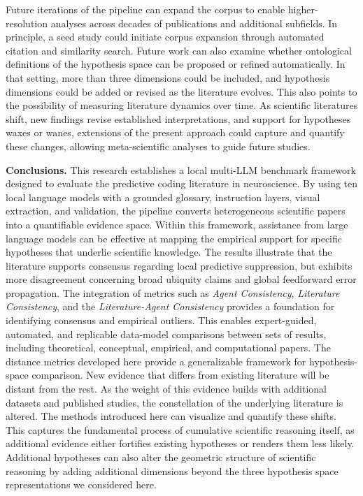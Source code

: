 \documentclass[12pt]{article}
\begin{document}
Future iterations of the pipeline can expand the corpus to enable higher-resolution analyses across decades of publications and additional subfields. In principle, a seed study could initiate corpus expansion through automated citation and similarity search. Future work can also examine whether ontological definitions of the hypothesis space can be proposed or refined automatically. In that setting, more than three dimensions could be included, and hypothesis dimensions could be added or revised as the literature evolves. This also points to the possibility of measuring literature dynamics over time. As scientific literatures shift, new findings revise established interpretations, and support for hypotheses waxes or wanes, extensions of the present approach could capture and quantify these changes, allowing meta-scientific analyses to guide future studies.


\noindent\textbf{Conclusions.} This research establishes a local multi-LLM benchmark framework designed to evaluate the predictive coding literature in neuroscience. By using ten local language models with a grounded glossary, instruction layers, visual extraction, and validation, the pipeline converts heterogeneous scientific papers into a quantifiable evidence space. Within this framework, assistance from large language models can be effective at mapping the empirical support for specific hypotheses that underlie scientific knowledge. The results illustrate that the literature supports consensus regarding local predictive suppression, but exhibits more disagreement concerning broad ubiquity claims and global feedforward error propagation. The integration of metrics such as \emph{Agent Consistency}, \emph{Literature Consistency}, and the \emph{Literature-Agent Consistency} provides a foundation for identifying consensus and empirical outliers. This enables expert-guided, automated, and replicable data-model comparisons between sets of results, including theoretical, conceptual, empirical, and computational papers. The distance metrics developed here provide a generalizable framework for hypothesis-space comparison. New evidence that differs from existing literature will be distant from the rest. As the weight of this evidence builds with additional datasets and published studies, the constellation of the underlying literature is altered. The methods introduced here can visualize and quantify these shifts. This captures the fundamental process of cumulative scientific reasoning itself, as additional evidence either fortifies existing hypotheses or renders them less likely. Additional hypotheses can also alter the geometric structure of scientific reasoning by adding additional dimensions beyond the three hypothesis space representations we considered here.
\end{document}
